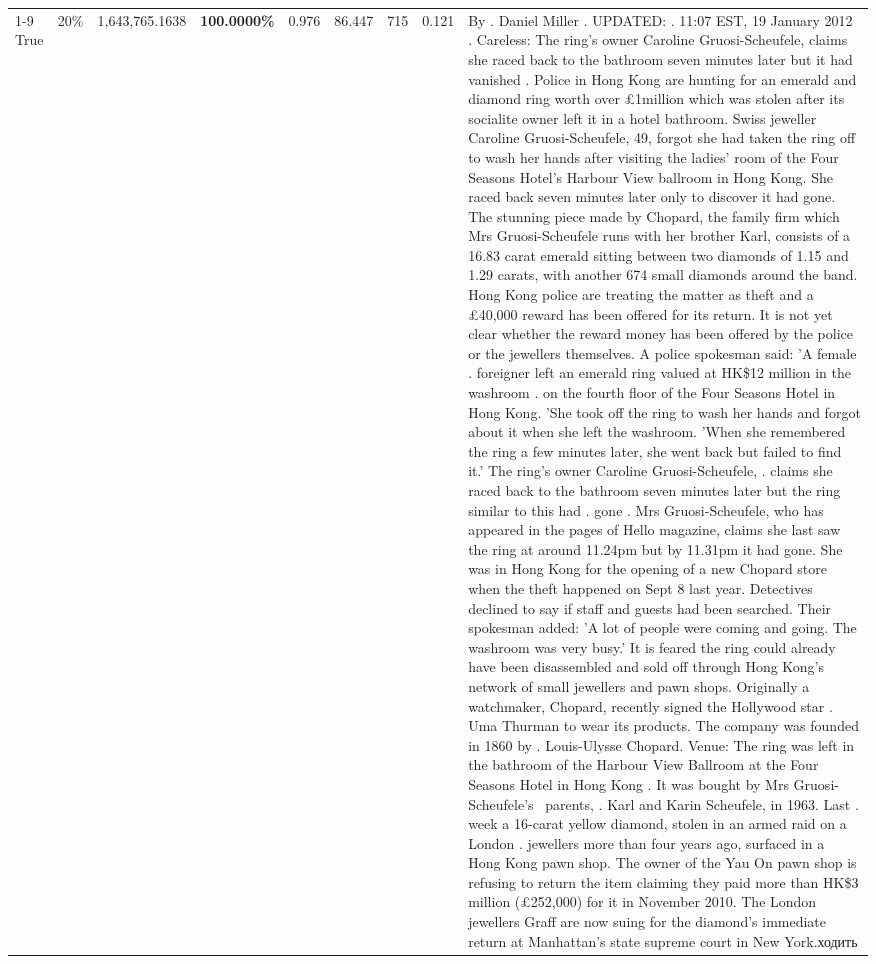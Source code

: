\begin{table}[H]
\begin{tabular}{lllrlllll}
\cline{1-9} \cline{2-9}
True & 20\% & 1,643,765.1638 & \bfseries \color{red} 100.0000\% & 0.976 & 86.447 & 715 & 0.121 & By . Daniel Miller . UPDATED: . 11:07 EST, 19 January 2012 . Careless: The ring's owner Caroline Gruosi-Scheufele, claims she raced back to the bathroom seven minutes later but it had vanished . Police in Hong Kong are hunting for an emerald and diamond ring worth over £1million which was stolen after its socialite owner left it in a hotel bathroom. Swiss jeweller Caroline Gruosi-Scheufele, 49, forgot she had taken the ring off to wash her hands after visiting the ladies' room of the Four Seasons Hotel's Harbour View ballroom in Hong Kong. She raced back seven minutes later only to discover it had gone. The stunning piece made by Chopard, the family firm which Mrs Gruosi-Scheufele runs with her brother Karl, consists of a 16.83 carat emerald sitting between two diamonds of 1.15 and 1.29 carats, with another 674 small diamonds around the band. Hong Kong police are treating the matter as theft and a £40,000 reward has been offered for its return. It is not yet clear whether the reward money has been offered by the police or the jewellers themselves. A police spokesman said: 'A female . foreigner left an emerald ring valued at HK\$12 million in the washroom . on the fourth floor of the Four Seasons Hotel in Hong Kong. 'She took off the ring to wash her hands and forgot about it when she left the washroom. 'When she remembered the ring a few minutes later, she went back but failed to find it.' The ring's owner Caroline Gruosi-Scheufele, . claims she raced back to the bathroom seven minutes later but the ring similar to this had . gone . Mrs Gruosi-Scheufele, who has appeared in the pages of Hello magazine, claims she last saw the ring at around 11.24pm but by 11.31pm it had gone. She was in Hong Kong for the opening of a new Chopard store when the theft happened on Sept 8 last year. Detectives declined to say if staff and guests had been searched. Their spokesman added: 'A lot of people were coming and going. The washroom was very busy.' It is feared the ring could already have been disassembled and sold off through Hong Kong's network of small jewellers and pawn shops. Originally a watchmaker, Chopard, recently signed the Hollywood star . Uma Thurman to wear its products. The company was founded in 1860 by . Louis-Ulysse Chopard. Venue: The ring was left in the bathroom of the Harbour View Ballroom at the Four Seasons Hotel in Hong Kong . It was bought by Mrs Gruosi-Scheufele's  parents, . Karl and Karin Scheufele, in 1963. Last . week a 16-carat yellow diamond, stolen in an armed raid on a London . jewellers more than four years ago, surfaced in a Hong Kong pawn shop. The owner of the Yau On pawn shop is refusing to return the item claiming they paid more than HK\$3 million (£252,000) for it in November 2010. The London jewellers Graff are now suing for the diamond’s immediate return at Manhattan’s state supreme court in New York.ходить \\

\end{tabular}
\end{table}
